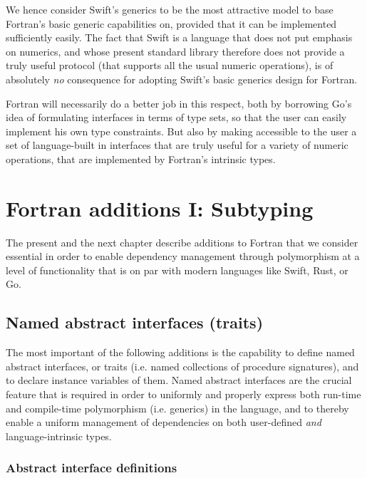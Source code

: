 \documentclass[11pt,oneside]{report}
\newcommand{\code}[1]{{\selectfont\ttfamily{#1}}}
\begin{document}
We hence consider Swift's generics to be the most attractive model to
base Fortran's basic generic capabilities on, provided that it can be
implemented sufficiently easily. The fact that Swift is a language
that does not put emphasis on numerics, and whose present standard
library therefore does not provide a truly useful \code{Numeric}
protocol (that supports all the usual numeric operations), is of
absolutely \emph{no} consequence for adopting Swift's basic generics
design for Fortran.

Fortran will necessarily do a better job in this respect, both by
borrowing Go's idea of formulating interfaces in terms of type sets,
so that the user can easily implement his own type constraints. But
also by making accessible to the user a set of language-built in
interfaces that are truly useful for a variety of numeric operations,
that are implemented by Fortran's intrinsic types.


\chapter{Fortran additions I: Subtyping}

The present and the next chapter describe additions to Fortran that we
consider essential in order to enable dependency management through
polymorphism at a level of functionality that is on par with modern
languages like Swift, Rust, or Go.

\section{Named abstract interfaces (traits)}

The most important of the following additions is the capability to
define named abstract interfaces, or traits (i.e. named collections of
procedure signatures), and to declare instance variables of
them. Named abstract interfaces are the crucial feature that is
required in order to uniformly and properly express both run-time and
compile-time polymorphism (i.e. generics) in the language, and to
thereby enable a uniform management of dependencies on both
user-defined \emph{and} language-intrinsic types.

\subsection{Abstract interface definitions}
\label{sect:interface_defs}
\end{document}
